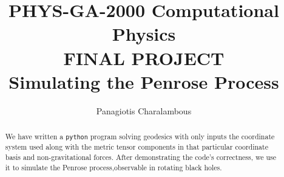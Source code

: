 \documentclass[a4paper,12pt]{article}
\title{PHYS-GA-2000 Computational Physics \\ FINAL PROJECT \\ Simulating the Penrose Process }
\author{Panagiotis Charalambous}
\newcommand{\code}[1]{\texttt{#1}}
\begin{document}
\maketitle

\begin{abstract}
	We have written a \code{python} program solving geodesics with only inputs the coordinate system used along with the metric tensor components in that particular coordinate basis and non-gravitational forces. After demonstrating the code's correctness, we use it to simulate the Penrose process,observable in rotating black holes.
\end{abstract}

\tableofcontents
\listoffigures
\listoftables






\begin{appendices}
	\noappendicestocpagenum
	
	
	
\end{appendices}



\end{document}
